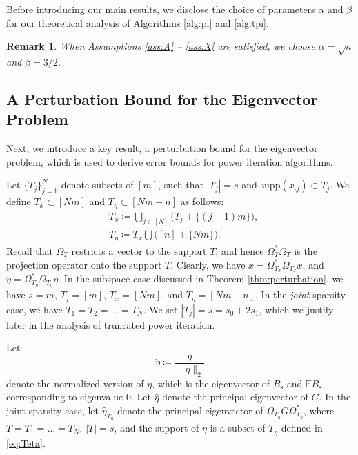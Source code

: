 \documentclass[11pt,journal]{IEEEtran}
\newcommand{\bbE}{\mathbb{E}}
\newcommand{\rms}{\mathrm{s}}
\newcommand{\norm}[1]{\|{#1}\|}
\newcommand{\supp}{\mathrm{supp}}
\newtheorem{remark}[theorem]{Remark}
\begin{document}
Before introducing our main results, we disclose the choice of parameters $\alpha$ and $\beta$ for our theoretical analysis of Algorithms \ref{alg:pi} and \ref{alg:tpi}. 
\begin{remark} \label{rem:parameter}
When Assumptions \ref{ass:A} -- \ref{ass:X} are satisfied, we choose $\alpha = \sqrt{n}$ and $\beta = 3/2$.
\end{remark}


\subsection{A Perturbation Bound for the Eigenvector Problem}

Next, we introduce a key result, a perturbation bound for the eigenvector problem, which is used to derive error bounds for power iteration algorithms.

Let $\{T_j\}_{j=1}^N$ denote subsets of $[m]$, such that $|T_j|= s$ and $\supp(x_{\cdot j}) \subset T_j$. We define $T_x \subset [Nm]$ and $T_\eta \subset [Nm + n]$ as follows:
\begin{align}
\label{eq:Tx} & T_x \coloneqq \bigcup_{j\in[N]} \bigl( T_j + \{(j-1)m\} \bigr), \\
\label{eq:Teta} & T_\eta \coloneqq T_x \bigcup \bigl( [n] + \{Nm\} \bigr).
\end{align}
Recall that $\Omega_{T}$ restricts a vector to the support $T$, and hence $\Omega_{T}^*\Omega_{T}$ is the projection operator onto the support $T$. Clearly, we have $x = \Omega_{T_x}^*\Omega_{T_x} x$, and $\eta = \Omega_{T_\eta}^*\Omega_{T_\eta}\eta$. In the subspace case discussed in Theorem \ref{thm:perturbation}, we have $s = m$, $T_j = [m]$, $T_x = [Nm]$, and $T_\eta = [Nm+n]$. In the \emph{joint} sparsity case, we have $T_1 = T_2 =\dots = T_N$. We set $|T_j| = s = s_0 + 2s_1$, which we justify later in the analysis of truncated power iteration.

Let 
\[
\dot{\eta} \coloneqq \frac{\eta}{\norm{\eta}_2}
\]
denote the normalized version of $\eta$, which is the eigenvector of $B_\rms$ and $\bbE B_\rms$ corresponding to eigenvalue $0$. 
Let $\hat{\eta}$ denote the principal eigenvector of $G$. In the joint sparsity case, let $\hat{\eta}_{T_\eta}$ denote the principal eigenvector of $\Omega_{T_\eta} G \Omega_{T_\eta}^*$, where $T = T_1 = \dots = T_N$, $|T|=s$, and the support of $\eta$ is a subset of $T_\eta$ defined in \eqref{eq:Teta}.
\end{document}
